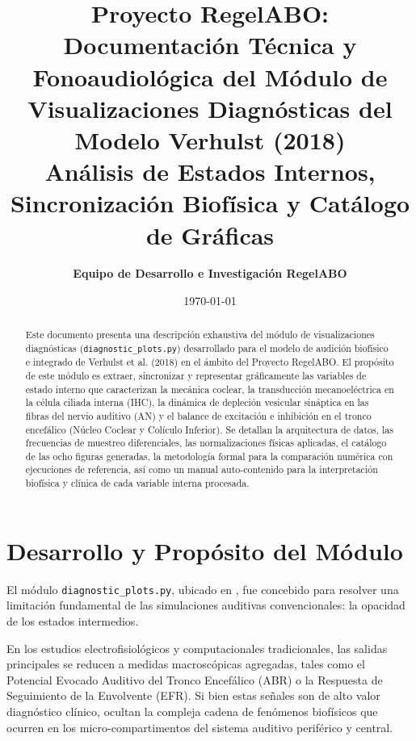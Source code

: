 \documentclass[12pt,a4paper]{article}
\title{\textbf{\Large Proyecto RegelABO: Documentación Técnica y Fonoaudiológica del Módulo de Visualizaciones Diagnósticas del Modelo Verhulst (2018)}\\[0.5em]
\large Análisis de Estados Internos, Sincronización Biofísica y Catálogo de Gráficas}
\author{\textbf{Equipo de Desarrollo e Investigación RegelABO}}
\date{\today}
\begin{document}
\maketitle

\begin{abstract}
Este documento presenta una descripción exhaustiva del módulo de visualizaciones diagnósticas (\texttt{diagnostic\_plots.py}) desarrollado para el modelo de audición biofísico e integrado de Verhulst et al. (2018) en el ámbito del Proyecto RegelABO. El propósito de este módulo es extraer, sincronizar y representar gráficamente las variables de estado interno que caracterizan la mecánica coclear, la transducción mecanoeléctrica en la célula ciliada interna (IHC), la dinámica de depleción vesicular sináptica en las fibras del nervio auditivo (AN) y el balance de excitación e inhibición en el tronco encefálico (Núcleo Coclear y Colículo Inferior). Se detallan la arquitectura de datos, las frecuencias de muestreo diferenciales, las normalizaciones físicas aplicadas, el catálogo de las ocho figuras generadas, la metodología formal para la comparación numérica con ejecuciones de referencia, así como un manual auto-contenido para la interpretación biofísica y clínica de cada variable interna procesada.
\end{abstract}

\tableofcontents
\newpage

\section{Desarrollo y Propósito del Módulo}

El módulo \texttt{diagnostic\_plots.py}, ubicado en , fue concebido para resolver una limitación fundamental de las simulaciones auditivas convencionales: la opacidad de los estados intermedios.

En los estudios electrofisiológicos y computacionales tradicionales, las salidas principales se reducen a medidas macroscópicas agregadas, tales como el Potencial Evocado Auditivo del Tronco Encefálico (ABR) o la Respuesta de Seguimiento de la Envolvente (EFR). Si bien estas señales son de alto valor diagnóstico clínico, ocultan la compleja cadena de fenómenos biofísicos que ocurren en los micro-compartimentos del sistema auditivo periférico y central.
\end{document}
